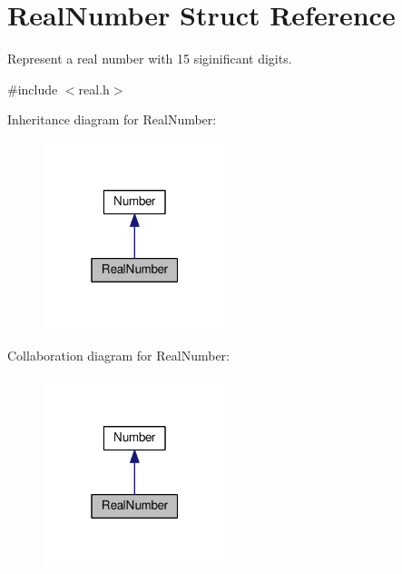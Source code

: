 \hypertarget{structRealNumber}{}\section{Real\+Number Struct Reference}
\label{structRealNumber}


Represent a real number with 15 siginificant digits.  




{\ttfamily \#include $<$real.\+h$>$}



Inheritance diagram for Real\+Number\+:
\nopagebreak
\begin{figure}[H]
\begin{center}
\leavevmode
\includegraphics[width=151pt]{da/d7c/structRealNumber__inherit__graph}
\end{center}
\end{figure}


Collaboration diagram for Real\+Number\+:
\nopagebreak
\begin{figure}[H]
\begin{center}
\leavevmode
\includegraphics[width=151pt]{d0/dd5/structRealNumber__coll__graph}
\end{center}
\end{figure}
